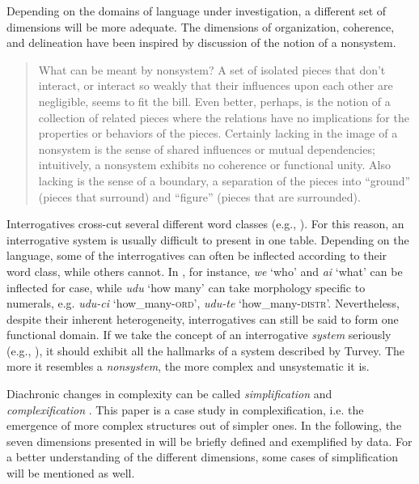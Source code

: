 \documentclass[output=paper,hidelinks]{langscibook}
\begin{document}
\noindent Depending on the domains of language under investigation, a different set of dimensions will be more adequate. The dimensions of organization, coherence, and delineation have been inspired by  discussion of the notion of a nonsystem.\largerpage

\begin{quote}
What can be meant by nonsystem? A set of isolated pieces that don’t interact, or interact so weakly that their influences upon each other are negligible, seems to fit the bill. Even better, perhaps, is the notion of a collection of related pieces where the relations have no implications for the properties or behaviors of the pieces. Certainly lacking in the image of a nonsystem is the sense of shared influences or mutual dependencies; intuitively, a nonsystem exhibits no coherence or functional unity. Also lacking is the sense of a boundary, a separation of the pieces into “ground” (pieces that surround) and “figure” (pieces that are surrounded). \citep[98f.]{Turvey2009}
\end{quote}

\noindent Interrogatives cross-cut several different word classes (e.g., \citealt[409]{Dixon2012}). For this reason, an interrogative system is usually difficult to present in one table. Depending on the language, some of the interrogatives can often be inflected according to their word class, while others cannot. In , for instance, \textit{we} `who' and \textit{ai} `what' can be inflected for case, while \textit{udu} `how many' can take morphology specific to numerals, e.g. \textit{udu-ci} `how\_many-\textsc{ord}', \textit{udu-te} `how\_many-\textsc{distr}'. Nevertheless, despite their inherent heterogeneity, interrogatives can still be said to form one functional domain. If we take the concept of an interrogative \textit{system} seriously (e.g., \citealt{MuyskenSmith1990}), it should exhibit all the hallmarks of a system described by Turvey. The more it resembles a \textit{nonsystem}, the more complex and unsystematic it is.

Diachronic changes in complexity can be called \textit{simplification} and \textit{complexification} \citep{Trudgill2011}. This paper is a case study in complexification, i.e. the emergence of more complex structures out of simpler ones. In the following, the seven dimensions presented in  will be briefly defined and exemplified by  data. For a better understanding of the different dimensions, some cases of simplification will be mentioned as well.
\end{document}
